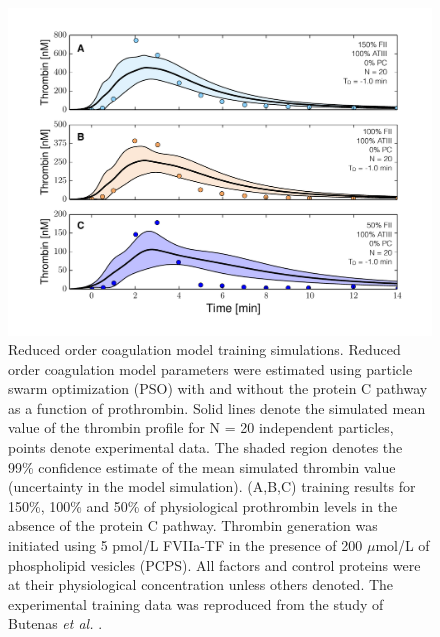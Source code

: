 \documentclass[12pt]{article}
\begin{document}
\begin{figure}
\centering
\includegraphics[width=1.0\textwidth]{./figs/Figure-3-DIFF_FII_NO_APC.pdf}
\caption{Reduced order coagulation model training simulations.
Reduced order coagulation model parameters were estimated using particle swarm optimization (PSO) with and without the protein C pathway as a function of prothrombin. 
Solid lines denote the simulated mean value of the thrombin profile for N = 20 independent particles, points denote experimental data. 
The shaded region denotes the 99\% confidence estimate of the mean simulated thrombin value (uncertainty in the model simulation).
(A,B,C) training results for 150\%, 100\% and 50\% of physiological prothrombin levels in the absence of the protein C pathway.
Thrombin generation was initiated using 5 pmol/L FVIIa-TF in the presence of 200 $\mu$mol/L of phospholipid vesicles (PCPS). 
All factors and control proteins were at their physiological concentration unless others denoted. 
The experimental training data was reproduced from the study of Butenas \textit{et al.} \citep{Butenas:1999aa}.}\label{fig-diff_fII_NO_APC}
\end{figure}

\clearpage
\end{document}
